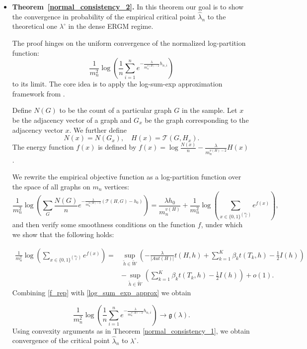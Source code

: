 \documentclass[12pt]{article}
\numberwithin{equation}{section}
\begin{document}
\begin{itemize}
    \item \textbf{Theorem~\ref{normal_consistency_2}.} 
 In this theorem our goal is to show the convergence in probability of the empirical critical point $\hat{\lambda}_n$ to the theoretical one $\lambda^{\circ}$ in the dense ERGM regime.

The proof hinges on the uniform convergence of the normalized log-partition function:
\[
\frac{1}{m_n^2}\log\left(\frac{1}{n}\sum_{i=1}^n e^{-\frac{\lambda}{m_n^{v(H)-2}} h_{n,i}}\right)
\]
to its limit. The core idea is to apply the log-sum-exp approximation framework from \cite{chatterjee2016nonlinear}.

Define $N(G)$  to be the count of a particular graph $G$ in the sample. Let $x$ be the adjacency vector of a graph and  $G_x$ be the graph corresponding to the adjacency vector $x$. We further define
$$N(x)=N(G_x), \quad H(x)=\mathcal{T}(G,H_x).$$ The energy function $f(x)$ is defined by 
$f(x)= \log\frac{N(x)}{n} - \frac{\lambda}{m_n^{v(H)-2}} H(x)$.

We rewrite the empirical objective function as a log-partition function over the space of all graphs on $m_n$ vertices:
\begin{equation}
\frac{1}{m_n^2}\log\left(\sum_{G} \frac{N(G)}{n} e^{-\frac{\lambda}{m_n^{v(H)-2}} (\mathcal{T}(H,G)-h_0)}\right) = \frac{\lambda h_0}{m_n^{v(H)}} + \frac{1}{m_n^2} \log \left(\sum_{x \in \{0,1\}^{\binom{m_n}{2}}} e^{f(x)}\right),
\label{f_rep}\end{equation}
 and then verify some smoothness conditions on the function $f$, under which we show that the following holds:

\begin{align} \frac{1}{m_n^2} \log \left(\sum_{x \in \{0,1\}^{\binom{m_n}{2}}} e^{f(x)}\right)=&\sup_{\tilde{h}\in\tilde{W}}\left(-\frac{\lambda}{|Aut(H)|} t(H,h) + \sum_{k=1}^K \beta_k t(T_k, h) - \frac{1}{2}I(h) \right)\nonumber\\
&- \sup_{\tilde{h}\in\tilde{W}}\left(\sum_{k=1}^K \beta_k t(T_k, h) - \frac{1}{2}I(h) \right)+o(1).\label{log_sum_exp_approx}\end{align}
Combining \eqref{f_rep} with \eqref{log_sum_exp_approx} we obtain 

\[
\frac{1}{m_n^2}\log\left(\frac{1}{n}\sum_{i=1}^n e^{-\frac{\lambda}{m_n^{v(H)-2}} h_{n,i}}\right)\rightarrow \mathfrak{g}(\lambda).
\]
Using convexity arguments as in Theorem \ref{normal_consistency_1}, we obtain convergence of the critical point $\hat{\lambda}_n$ to $\lambda^{\circ}$.\\


\end{itemize}
\end{document}
